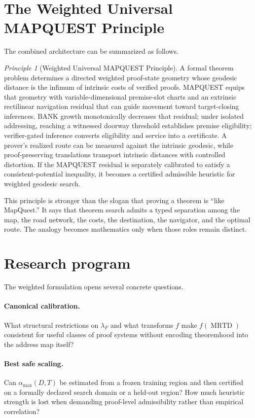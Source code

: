 \documentclass[11pt]{article}
\theoremstyle{definition}
\theoremstyle{remark}
\newtheorem{principle}[theorem]{Principle}
\newcommand{\MRTD}{\operatorname{MRTD}}
\begin{document}
\section{The Weighted Universal MAPQUEST Principle}

The combined architecture can be summarized as follows.

\begin{principle}[Weighted Universal MAPQUEST Principle]
A formal theorem problem determines a directed weighted proof-state geometry whose geodesic distance is the infimum of intrinsic costs of verified proofs. MAPQUEST equips that geometry with variable-dimensional premise-slot charts and an extrinsic rectilinear navigation residual that can guide movement toward target-closing inferences. BANK growth monotonically decreases that residual; under isolated addressing, reaching a witnessed doorway threshold establishes premise eligibility; verifier-gated inference converts eligibility and service into a certificate. A prover's realized route can be measured against the intrinsic geodesic, while proof-preserving translations transport intrinsic distances with controlled distortion. If the MAPQUEST residual is separately calibrated to satisfy a consistent-potential inequality, it becomes a certified admissible heuristic for weighted geodesic search.
\end{principle}

This principle is stronger than the slogan that proving a theorem is ``like MapQuest.'' It says that theorem search admits a typed separation among the map, the road network, the costs, the destination, the navigator, and the optimal route. The analogy becomes mathematics only when those roles remain distinct.

\section{Research program}

The weighted formulation opens several concrete questions.

\paragraph{Canonical calibration.}
What structural restrictions on $\lambda_F$ and what transforms $f$ make $f(\MRTD)$ consistent for useful classes of proof systems without encoding theoremhood into the address map itself?

\paragraph{Best safe scaling.}
Can $\alpha_{\max}(D,T)$ be estimated from a frozen training region and then certified on a formally declared search domain or a held-out region? How much heuristic strength is lost when demanding proof-level admissibility rather than empirical correlation?
\end{document}
